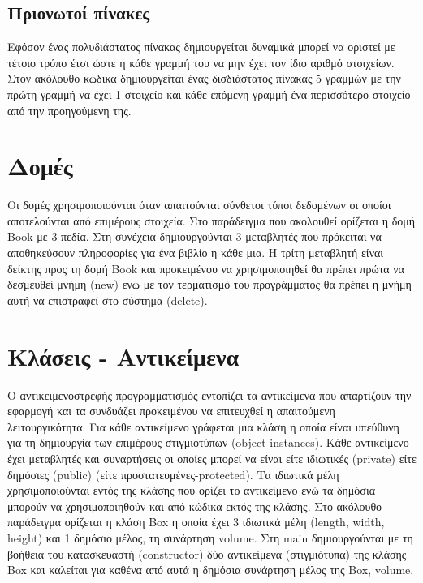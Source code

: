 


\subsection{Πριονωτοί πίνακες}
Εφόσον ένας πολυδιάστατος πίνακας δημιουργείται δυναμικά μπορεί να οριστεί με τέτοιο τρόπο έτσι ώστε η κάθε γραμμή του να μην έχει τον ίδιο αριθμό στοιχείων. Στον ακόλουθο κώδικα δημιουργείται ένας δισδιάστατος πίνακας 5 γραμμών με την πρώτη γραμμή να έχει 1 στοιχείο και κάθε επόμενη γραμμή ένα περισσότερο στοιχείο από την προηγούμενη της.





\section{Δομές}
Οι δομές χρησιμοποιούνται όταν απαιτούνται σύνθετοι τύποι δεδομένων οι οποίοι αποτελούνται από επιμέρους στοιχεία. Στο παράδειγμα που ακολουθεί ορίζεται η δομή Book με 3 πεδία. Στη συνέχεια δημιουργούνται 3 μεταβλητές που πρόκειται να αποθηκεύσουν πληροφορίες για ένα βιβλίο η κάθε μια.  Η τρίτη μεταβλητή είναι δείκτης προς τη δομή Book και προκειμένου να χρησιμοποιηθεί θα πρέπει πρώτα να δεσμευθεί μνήμη (new) ενώ με τον τερματισμό του προγράμματος θα πρέπει η μνήμη αυτή να επιστραφεί στο σύστημα (delete).





\section{Κλάσεις - Αντικείμενα}
Ο αντικειμενοστρεφής προγραμματισμός εντοπίζει τα αντικείμενα που απαρτίζουν την εφαρμογή και τα συνδυάζει προκειμένου να επιτευχθεί η απαιτούμενη λειτουργικότητα. Για κάθε αντικείμενο γράφεται μια κλάση η οποία είναι υπεύθυνη για τη δημιουργία των επιμέρους στιγμιοτύπων (object instances). Κάθε αντικείμενο έχει μεταβλητές και συναρτήσεις οι οποίες μπορεί να είναι είτε ιδιωτικές (private) είτε δημόσιες (public) (είτε προστατευμένες-protected).  Τα ιδιωτικά μέλη χρησιμοποιούνται εντός της κλάσης που ορίζει το αντικείμενο ενώ τα δημόσια μπορούν να χρησιμοποιηθούν και από κώδικα εκτός της κλάσης. Στο ακόλουθο παράδειγμα ορίζεται η κλάση Box η οποία έχει 3 ιδιωτικά μέλη (length, width, height) και 1 δημόσιο μέλος,  τη συνάρτηση volume. Στη main δημιουργούνται με τη βοήθεια του κατασκευαστή (constructor) δύο αντικείμενα (στιγμιότυπα) της κλάσης Box και καλείται για καθένα από αυτά η δημόσια συνάρτηση μέλος της Box, volume. 

